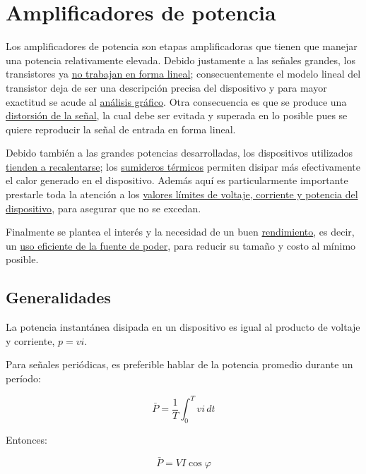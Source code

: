 
\chapter{Amplificadores de potencia} %

Los amplificadores de potencia son etapas amplificadoras que tienen que manejar una potencia relativamente elevada. Debido justamente a las señales grandes, los transistores ya \underline{no trabajan en forma lineal}; consecuentemente el modelo lineal del transistor deja de ser una descripción precisa del dispositivo y para mayor exactitud se acude al \underline{análisis gráfico}. Otra consecuencia es que se produce una \underline{distorsión de la señal}, la cual debe ser evitada y superada en lo posible pues se quiere reproducir la señal de entrada en forma lineal. 

Debido también a las grandes potencias desarrolladas, los dispositivos utilizados \underline{tienden a recalentarse}; los \underline{sumideros térmicos} permiten disipar más efectivamente el calor generado en el dispositivo. Además aquí es particularmente importante prestarle toda la atención a los \underline{valores límites de voltaje, corriente y potencia del dispositivo}, para asegurar que no se excedan. 

Finalmente se plantea el interés y la necesidad de un buen \underline{rendimiento}, es decir, un \underline{uso eficiente de la fuente de poder}, para reducir su tamaño y costo al mínimo posible.

\section{Generalidades} %

La potencia instantánea disipada en un dispositivo es igual al producto de voltaje y corriente, $p = vi$.

Para señales periódicas, es preferible hablar de la potencia promedio durante un período:

\begin{equation}
	\bar{P} = \frac{1}{T} \int_0^T vi \, dt
\end{equation}

Entonces:

\begin{equation}
	\bar{P} = V I \cos \varphi
\end{equation}

